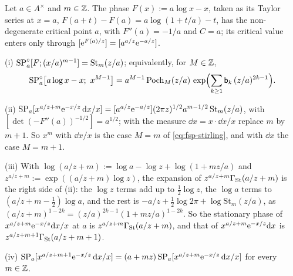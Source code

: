 \begin{lem}
\label{lem:fsp-stirling}
Let $a\in A^\times$ and $m\in\mathbb{Z}$. The phase $F(x):=a\log x-x$, taken as its Taylor series at $x=a$, $F(a+t)-F(a)=a\log(1+t/a)-t$, has the non-degenerate critical point $a$, with $F''(a)=-1/a$ and $C=a$; its critical value enters only through $[\mathrm{e}^{F(a)/z}]=[a^{a/z}\mathrm{e}^{-a/z}]$.

(i) $\mathrm{SP}^{\circ}_a[F;(x/a)^{m-1}]=\mathrm{St}_m(z/a)$; equivalently, for $M\in\mathbb{Z}$,
\begin{equation}
\label{eq:fsp-stirling}
\SPn_a\bigl[a\log x-x;\ x^{M-1}\bigr]=a^{M-1}\,\mathrm{Poch}_M(z/a)\,\exp\Bigl(\sum_{k\geq1}\bk_k\,(z/a)^{2k-1}\Bigr).
\end{equation}

(ii) $\mathrm{SP}_a[x^{a/z+m}\mathrm{e}^{-x/z}\,\mathrm{d} x/x]=[a^{a/z}\mathrm{e}^{-a/z}](2\pi z)^{1/2}a^{m-1/2}\,\mathrm{St}_m(z/a)$, with $[\det(-F''(a))^{-1/2}]=a^{1/2}$; with the measure $\dd x=x\cdot\dd x/x$ replace $m$ by $m+1$. So $x^m$ with $\dd x/x$ is the case $M=m$ of \eqref{eq:fsp-stirling}, and with $\dd x$ the case $M=m+1$.

(iii) With $\log(a/z+m):=\log a-\log z+\log(1+mz/a)$ and $z^{a/z+m}:=\exp((a/z+m)\log z)$, the expansion of $z^{a/z+m}\Gamma_{\mathrm{St}}(a/z+m)$ is the right side of (ii): the $\log z$ terms add up to $\frac12\log z$, the $\log a$ terms to $(a/z+m-\frac12)\log a$, and the rest is $-a/z+\frac12\log2\pi+\log\mathrm{St}_m(z/a)$, as $(a/z+m)^{1-2k}=(z/a)^{2k-1}(1+mz/a)^{1-2k}$. So the stationary phase of $x^{a/z+m}\mathrm{e}^{-x/z}\mathrm{d} x/x$ at $a$ is $z^{a/z+m}\Gamma_{\mathrm{St}}(a/z+m)$, and that of $x^{a/z+m}\mathrm{e}^{-x/z}\mathrm{d} x$ is $z^{a/z+m+1}\Gamma_{\mathrm{St}}(a/z+m+1)$.

(iv) $\mathrm{SP}_a[x^{a/z+m+1}\mathrm{e}^{-x/z}\,\mathrm{d} x/x]=(a+mz)\,\mathrm{SP}_a[x^{a/z+m}\mathrm{e}^{-x/z}\,\mathrm{d} x/x]$ for every $m\in\mathbb{Z}$.
\end{lem}

